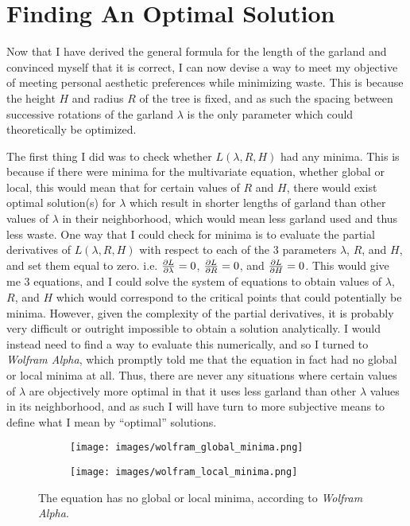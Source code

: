 \section{Finding An Optimal Solution}

Now that I have derived the general formula for the length of the garland and convinced myself that it is correct, I can now devise a way to meet my objective of meeting personal aesthetic preferences while minimizing waste. This is because the height $H$ and radius $R$ of the tree is fixed, and as such the spacing between successive rotations of the garland $\lambda$ is the only parameter which could theoretically be optimized.

The first thing I did was to check whether $L(\lambda, R, H)$ had any minima. This is because if there were minima for the multivariate equation, whether global or local, this would mean that for certain values of $R$ and $H$, there would exist optimal solution(s) for $\lambda$ which result in shorter lengths of garland than other values of $\lambda$ in their neighborhood, which would mean less garland used and thus less waste. One way that I could check for minima is to evaluate the partial derivatives of $L(\lambda, R, H)$ with respect to each of the 3 parameters $\lambda$, $R$, and $H$, and set them equal to zero. i.e. $\pdv{L}{\lambda} = 0$, $\pdv{L}{R} = 0$, and $\pdv{L}{H} = 0$. This would give me 3 equations, and I could solve the system of equations to obtain values of $\lambda$, $R$, and $H$ which would correspond to the critical points that could potentially be minima. However, given the complexity of the partial derivatives, it is probably very difficult or outright impossible to obtain a solution analytically. I would instead need to find a way to evaluate this numerically, and so I turned to \emph{Wolfram Alpha}, which promptly told me that the equation in fact had no global or local minima at all.  Thus, there are never any situations where certain values of $\lambda$ are objectively more optimal in that it uses less garland than other $\lambda$ values in its neighborhood, and as such I will have turn to more subjective means to define what I mean by ``optimal'' solutions.
\begin{figure}[H]
    \centering
    \begin{subfigure}[t]{0.7\textwidth}
        \centering
        \texttt{[image: images/wolfram\_global\_minima.png]}
    \end{subfigure}
\end{figure}
\begin{figure}[H]\ContinuedFloat
    \centering
    \begin{subfigure}[t]{0.7\textwidth}
        \centering
        \texttt{[image: images/wolfram\_local\_minima.png]}
    \end{subfigure}
    \caption{The equation has no global or local minima, according to \emph{Wolfram Alpha}.}
    \vspace*{-10pt}
\end{figure}

